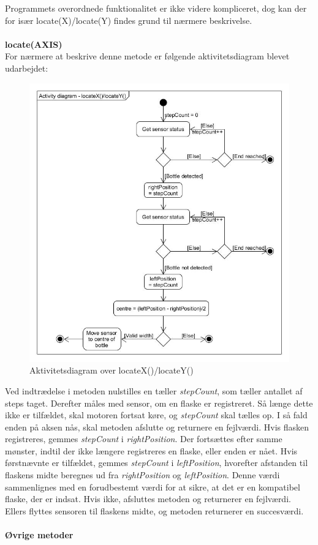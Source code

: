 Programmets overordnede funktionalitet er ikke videre kompliceret, dog kan der for især locate(X)/locate(Y) findes grund til nærmere beskrivelse.
\\
\\
\textbf{locate(AXIS)} \\
For nærmere at beskrive denne metode er følgende aktivitetsdiagram blevet udarbejdet: \\

\begin{figure}[H]
	\centerline{\includegraphics[scale=0.5]{tex/Design/PSoC/AD_locate.jpg}}
	\caption{Aktivitetsdiagram over locateX()/locateY()}
	\label{AD_locate}
\end{figure}

Ved indtrædelse i metoden nulstilles en tæller \textit{stepCount}, som tæller antallet af steps taget. Derefter måles med sensor, om en flaske er registreret. Så længe dette ikke er tilfældet, skal motoren fortsat køre, og \textit{stepCount} skal tælles op. I så fald enden på aksen nås, skal metoden afslutte og returnere en fejlværdi. Hvis flasken registreres, gemmes \textit{stepCount} i \textit{rightPosition}. Der fortsættes efter samme mønster, indtil der ikke længere registreres en flaske, eller enden er nået. Hvis førstnævnte er tilfældet, gemmes \textit{stepCount} i \textit{leftPosition}, hvorefter afstanden til flaskens midte beregnes ud fra \textit{rightPosition} og \textit{leftPosition}. Denne værdi sammenlignes med en forudbestemt værdi for at sikre, at det er en kompatibel flaske, der er indsat. Hvis ikke, afsluttes metoden og returnerer en fejlværdi. Ellers flyttes sensoren til flaskens midte, og metoden returnerer en succesværdi.
\\
\\
\textbf{Øvrige metoder}

